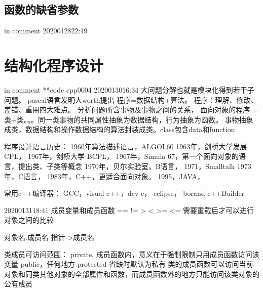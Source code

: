 \documentclass[UTF8]{article}
\begin{document}
\subsection{函数的缺省参数}
in comment
2020012822:19
\begin{comment}
最右边的若干连续参数可以缺省
void func(int x1, int x2 = 2, int x3 = 3){}
用处在于函数添加新参数时不需要修改原来不用新参数的对函数的调用。比如说原来写的单色的绘图函数加上可选颜色的属性。

\end{comment}



\section{结构化程序设计}
in comment
**code cpp0004
2020013016:34
大问题分解也就是模块化得到若干子问题。
pascal语言发明人worth提出 程序=数据结构+算法。
程序：理解、修改、差错、重用四大难点。
分析问题所含事物及事物之间的关系，
面向对象的程序 = 类+类。。。同一类事物的共同属性抽象为数据结构，行为抽象为函数。
事物抽象成类，数据结构和操作数据结构的算法封装成类。class包含data和function



程序设计语言历史：
1960年算法描述语言，ALGOL60
1963年，剑桥大学发展 CPL，
1967年，剑桥大学 BCPL，
1967年，Simula 67，第一个面向对象的语言，提出类、子类等概念
1970年，贝尔实验室，B语言，
1971，Smalltalk
1973年，C语言，
1983年，C++，更适合面向对象。
1995，JAVA，


常用c++编译器：
GCC，visual c++，dev c， eclipse， borand c++Builder

2020013118:41
成员变量和成员函数
== != > < >= <= 需要重载后才可以进行对象之间的比较

对象名.成员名
指针->成员名


类成员可访问范围：
private, 成员函数内，意义在于强制限制只用成员函数访问该变量
public，任何地方
protected
省缺时默认为私有
类的成员函数可以访问当前对象和同类其他对象的全部属性和函数，而成员函数外的地方只能访问该类对象的公有成员
\begin{comment}

\end{comment}
\end{document}
